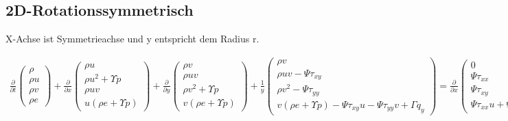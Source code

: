 \newpage

\subsection{2D-Rotationssymmetrisch}
X-Achse ist Symmetrieachse und y entspricht dem Radius r.

\begin{align*}
\frac{\partial}{\partial t}
\begin{pmatrix}
\rho
\\
\rho u
\\
\rho v
\\
\rho e
\end{pmatrix}
+
\frac{\partial}{\partial x}
\begin{pmatrix}
\rho u
\\
\rho u^2 + \Upsilon p
\\
\rho uv
\\
u\left(\rho e+\Upsilon p\right)
\end{pmatrix}
+
\frac{\partial}{\partial y}
\begin{pmatrix}
\rho v
\\
\rho uv
\\
\rho v^2 + \Upsilon p
\\
v\left(\rho e+\Upsilon p\right)
\end{pmatrix}
+
\frac{1}{y}
\begin{pmatrix}
\rho v
\\
\rho uv - \Psi \tau_{xy}
\\
\rho v^2 - \Psi \tau_{yy}
\\
v\left(\rho e+\Upsilon p\right) - \Psi \tau_{xy} u - \Psi \tau_{yy} v + \Gamma q_y
\end{pmatrix}
=
\frac{\partial}{\partial x}
\begin{pmatrix}
0
\\
\Psi \tau_{xx}
\\
\Psi \tau_{xy}
\\
\Psi \tau_{xx}u+\Psi \tau_{xy}v-\Gamma q_x
\end{pmatrix}
+\frac{\partial}{\partial y}
\begin{pmatrix}
0
\\
\Psi \tau_{yx}
\\
\Psi \tau_{yy}
\\
\Psi \tau_{yx}u+\Psi \tau_{yy}v-\Gamma q_y
\end{pmatrix}
\end{align*}

